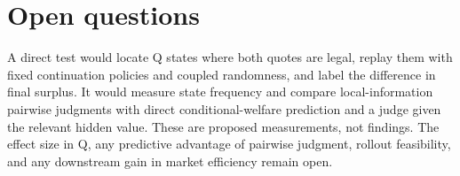 \documentclass{article}
\begin{document}
\section{Open questions}

A direct test would locate Q states where both quotes are legal, replay them with fixed continuation policies
and coupled randomness, and label the difference in final surplus. It would measure state frequency and
compare local-information pairwise judgments with direct conditional-welfare prediction and a judge given the
relevant hidden value. These are proposed measurements, not findings. The effect size in Q, any predictive
advantage of pairwise judgment, rollout feasibility, and any downstream gain in market efficiency remain open.



\end{document}
